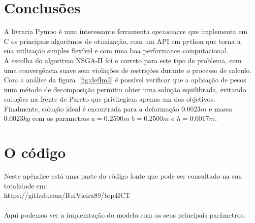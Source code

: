 \documentclass[a4paper,12pt]{article}
\begin{document}
\section{Conclusões}

A livraria Pymoo é uma interessante ferramenta $open source$ que implementa em C os principais algoritmos de otimização, com um API em python que torna a sua utilização simples flexível e com uma boa performance computacional.\\
A escolha do algoritmo NSGA-II foi o correto para este tipo de problema, com uma convergência suave sem violações de restrições durante o processo de calculo.\\
Com a análise da figura~\ref{fig:defIm2} é possível verificar que a aplicação de pesos num método de decomposição permitiu obter uma solução equilibrada, evitando soluções na frente de Pareto que privilegiem apenas um dos objetivos.\\
Finalmente, solução ideal é encontrada para a deformação $0.0023m$ e massa $0.0023kg$ com os parametros $a=0.2500m$ $b=0.2500m$ e $h=0.0017m$.

\newpage

\appendix

\section{O código}\label{A:1}

Neste apêndice está uma parte do código fonte que pode ser consultado na sua totalidade em:\\ https://github.com/RuiVieira89/top4ICT\\
\\
Aqui podemos ver a implemtação do modelo com os seus principais parâmetros.
\end{document}
